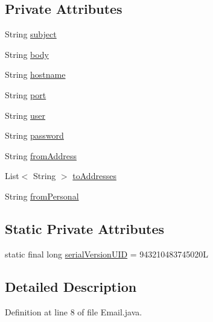 \subsection*{Private Attributes}
\begin{DoxyCompactItemize}
\item 
String \hyperlink{classbr_1_1usp_1_1cata_1_1model_1_1_email_a4c5ca463c3db38d15f893ed8e2ec8f8f}{subject}
\item 
String \hyperlink{classbr_1_1usp_1_1cata_1_1model_1_1_email_a4bd8b5c8a814752d6f98a01bd231a37b}{body}
\item 
String \hyperlink{classbr_1_1usp_1_1cata_1_1model_1_1_email_ac7c7a138711655396f5ff6784f9fa720}{hostname}
\item 
String \hyperlink{classbr_1_1usp_1_1cata_1_1model_1_1_email_a6dfbe1e23003fbd851bce14c0568dcf8}{port}
\item 
String \hyperlink{classbr_1_1usp_1_1cata_1_1model_1_1_email_a3d21f816dce9038a65e12ff5476dda12}{user}
\item 
String \hyperlink{classbr_1_1usp_1_1cata_1_1model_1_1_email_a33ee916dcfa41c830317e93ce3a68c3e}{password}
\item 
String \hyperlink{classbr_1_1usp_1_1cata_1_1model_1_1_email_ac14d376423021153643da3fb9fb71153}{from\+Address}
\item 
List$<$ String $>$ \hyperlink{classbr_1_1usp_1_1cata_1_1model_1_1_email_aa2dd2e6b3172d41d0b4af46e07687e0d}{to\+Addresses}
\item 
String \hyperlink{classbr_1_1usp_1_1cata_1_1model_1_1_email_a1b531f2c52d506121d3b17e04aeebca7}{from\+Personal}
\end{DoxyCompactItemize}
\subsection*{Static Private Attributes}
\begin{DoxyCompactItemize}
\item 
static final long \hyperlink{classbr_1_1usp_1_1cata_1_1model_1_1_email_a9db623d01d0113f9dab5305f1ddb435d}{serial\+Version\+U\+I\+D} = 943210483745020\+L
\end{DoxyCompactItemize}


\subsection{Detailed Description}


Definition at line 8 of file Email.\+java.



